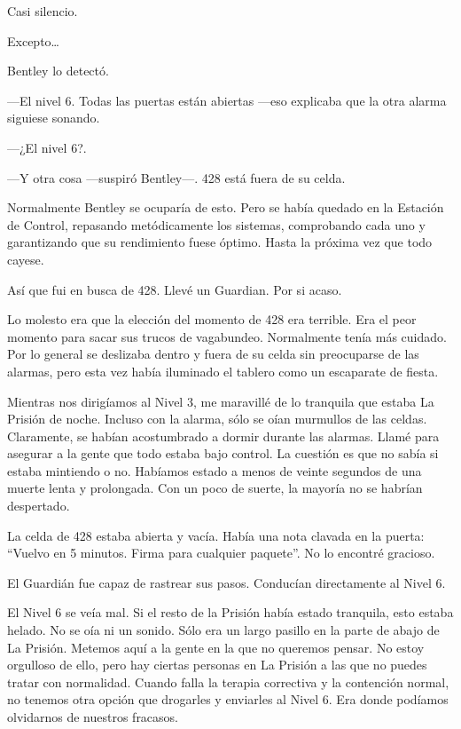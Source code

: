Casi silencio.

Excepto\ldots{}

Bentley lo detectó.

---El nivel 6. Todas las puertas están abiertas ---eso explicaba que la
otra alarma siguiese sonando.

---¿El nivel 6?.

---Y otra cosa ---suspiró Bentley---. 428 está fuera de su celda.

Normalmente Bentley se ocuparía de esto. Pero se había quedado en la
Estación de Control, repasando metódicamente los sistemas, comprobando
cada uno y garantizando que su rendimiento fuese óptimo. Hasta la
próxima vez que todo cayese.

Así que fui en busca de 428. Llevé un Guardian. Por si acaso.

Lo molesto era que la elección del momento de 428 era terrible. Era el
peor momento para sacar sus trucos de vagabundeo. Normalmente tenía más
cuidado. Por lo general se deslizaba dentro y fuera de su celda sin
preocuparse de las alarmas, pero esta vez había iluminado el tablero
como un escaparate de fiesta.

Mientras nos dirigíamos al Nivel 3, me maravillé de lo tranquila que
estaba La Prisión de noche. Incluso con la alarma, sólo se oían
murmullos de las celdas. Claramente, se habían acostumbrado a dormir
durante las alarmas. Llamé para asegurar a la gente que todo estaba bajo
control. La cuestión es que no sabía si estaba mintiendo o no. Habíamos
estado a menos de veinte segundos de una muerte lenta y prolongada. Con
un poco de suerte, la mayoría no se habrían despertado.

La celda de 428 estaba abierta y vacía. Había una nota clavada en la
puerta: ``Vuelvo en 5 minutos. Firma para cualquier paquete''. No lo
encontré gracioso.

El Guardián fue capaz de rastrear sus pasos. Conducían directamente al
Nivel 6.

El Nivel 6 se veía mal. Si el resto de la Prisión había estado
tranquila, esto estaba helado. No se oía ni un sonido. Sólo era un largo
pasillo en la parte de abajo de La Prisión. Metemos aquí a la gente en
la que no queremos pensar. No estoy orgulloso de ello, pero hay ciertas
personas en La Prisión a las que no puedes tratar con normalidad. Cuando
falla la terapia correctiva y la contención normal, no tenemos otra
opción que drogarles y enviarles al Nivel 6. Era donde podíamos
olvidarnos de nuestros fracasos.

